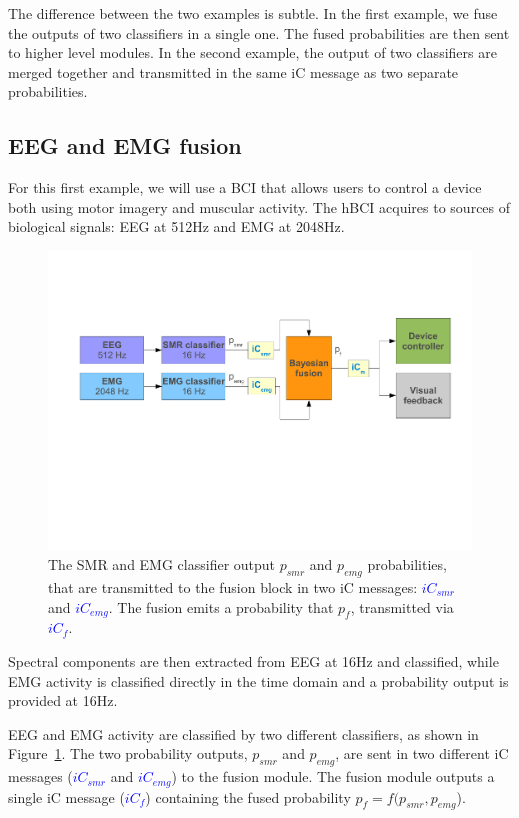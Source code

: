\documentclass[a4paper,10pt]{article}
\newcommand{\temp}[1]{\textcolor{blue}{\textbf{#1}}}
\begin{document}
The difference between the two examples is subtle.
In the first example, we fuse the outputs of two classifiers in a single one.
The fused probabilities are then sent to higher level modules.
In the second example, the output of two classifiers are merged together and
transmitted in the same iC message as two separate probabilities.

\subsection{EEG and EMG fusion}
\label{sec:hbci:example1}
For this first example, we will use a BCI that allows users to control a device
both using motor imagery and muscular activity. 
The hBCI acquires to sources of biological signals: EEG at 512Hz and EMG at
2048Hz.
\begin{figure}[!h]
  \begin{center}
	\includegraphics[width=\textwidth]{figures/example1.pdf}
	\caption{The SMR and EMG classifier output $p_{smr}$ and $p_{emg}$
	probabilities, that are transmitted to the fusion block in two iC messages: 
	\temp{$iC_{smr}$} and \temp{$iC_{emg}$}. The fusion emits a probability that
	$p_{f}$, transmitted via \temp{$iC_{f}$}.}
	\label{fig:hbci:example1}
  \end{center}
\end{figure}
Spectral components are then extracted from EEG at 16Hz and classified, 
while EMG activity is classified directly in the time domain and a probability
output is provided at 16Hz.

EEG and EMG activity are classified by two different classifiers, as shown in
Figure~\ref{fig:hbci:example1}.
The two probability outputs, $p_{smr}$ and $p_{emg}$, are sent
in two different iC messages (\temp{$iC_{smr}$} and
\temp{$iC_{emg}$}) to the fusion module. 
The fusion module outputs a single iC message (\temp{$iC_{f}$})
containing the fused probability $p_{f}=f(p_{smr}, p_{emg}$). 
\end{document}
